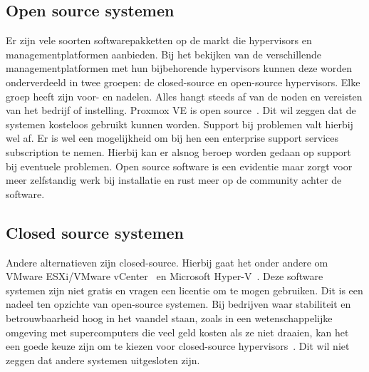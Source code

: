 \subsection{Open source systemen}\label{subsec:opensource}
Er zijn vele soorten softwarepakketten op de markt die hypervisors en managementplatformen aanbieden. Bij het bekijken van de verschillende managementplatformen met hun bijbehorende hypervisors kunnen deze worden onderverdeeld in twee groepen: de closed-source en open-source hypervisors. Elke groep heeft zijn voor- en nadelen. Alles hangt steeds af van de noden en vereisten van het bedrijf of instelling.
Proxmox VE is open source~\autocite{Proxmox}. Dit wil zeggen dat de systemen kosteloos gebruikt kunnen worden. Support bij problemen valt hierbij wel af. Er is wel een mogelijkheid om bij hen een enterprise support services subscription te nemen. Hierbij kan er alsnog beroep worden gedaan op support bij eventuele problemen.
Open source software is een evidentie maar zorgt voor meer zelfstandig werk bij installatie en rust meer op de community achter de software.

\subsection{Closed source systemen}\label{subsec:clousedsource}
Andere alternatieven zijn closed-source. Hierbij gaat het onder andere om VMware ESXi/VMware vCenter~\autocite{vmware} en Microsoft Hyper-V~\autocite{Eaton2019}. Deze software systemen zijn niet gratis en vragen een licentie om te mogen gebruiken. Dit is een nadeel ten opzichte van open-source systemen.
Bij bedrijven waar stabiliteit en betrouwbaarheid hoog in het vaandel staan, zoals in een wetenschappelijke omgeving met supercomputers die veel geld kosten als ze niet draaien, kan het een goede keuze zijn om te kiezen voor closed-source hypervisors~\autocite{voras2012early}. Dit wil niet zeggen dat andere systemen uitgesloten zijn.


